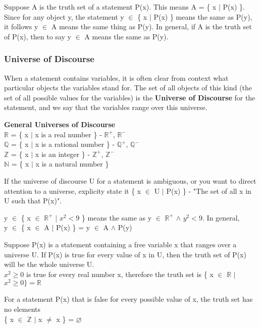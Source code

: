 \documentclass[11pt]{article}
\theoremstyle{definition}
\theoremstyle{remark}
\begin{document}
Suppose A is the truth set of a statement P(x). This means A = \{ x $|$ P(x) \}. Since for any object y, the statement y $\in$ \{ x $|$ P(x) \}
means the same as P(y), it follows y $\in$ A means the same thing as P(y).
In general, if A is the truth set of P(x), then to say y $\in$ A means the same as P(y).

\subsubsection{Universe of Discourse}
When a statement contains variables, it is often clear from context what particular objects the variables stand for.
The set of all objects of this kind (the set of all possible values for the variables) is the \textbf{Universe of Discourse} for the statement, and
we say that the variables range over this universe.

\begin{shaded}
\textbf{General Universes of Discourse}\\
$\mathbb{R}$ = \{ x $|$ x is a real number \} - $\mathbb{R}^+$, $\mathbb{R}^-$\\ 
$\mathbb{Q}$ = \{ x $|$ x is a rational number \} - $\mathbb{Q}^+$, $\mathbb{Q}^-$\\
$\mathbb{Z}$ = \{ x $|$ x is an integer \} - $\mathbb{Z}^+$, $\mathbb{Z}^-$\\
$\mathbb{N}$ = \{ x $|$ x is a natural number \}
\end{shaded}
If the universe of discourse U for a statement is ambiguous, or you want to direct attention to a
universe, explicity state it \{ x $\in$ U $|$ P(x) \} - "The set of all x in U such that P(x)".

y $\in$ \{ x $\in$ $\mathbb{R}^+$ $|$ $x^2 < 9$ \} means the same as y $\in$ $\mathbb{R}^+$ $\land$ $y^2 < 9$. In general, \\
y $\in$ \{ x $\in$ A $|$ P(x) \} = y $\in$ A $\land$ P(y)

Suppose P(x) is a statement containing a free variable x that ranges over a universe U. If P(x)
is true for every value of x in U, then the truth set of P(x) will be the whole universe U.\\
$x^2 \geq 0$ is true for every real number x, therefore the truth set is \{ x $\in$ $\mathbb{R}$ $|$ $x^2 \geq 0 \} = \mathbb{R}$

For a statement P(x) that is false for every possible value of x, the truth set has no elements\\
\{ x $\in$ $\mathbb{Z}$ $|$ x $\neq$ x \} = $\varnothing$
\end{document}
